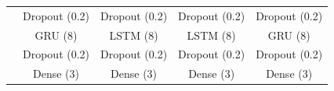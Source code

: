 \begin{table}[htbp]
\begin{tabular}{r|cccccccc}
          & \multicolumn{2}{c}{Dropout (0.2)} & \multicolumn{2}{c}{Dropout (0.2)} & \multicolumn{2}{c}{Dropout (0.2)} & \multicolumn{2}{c}{Dropout (0.2)} \\
          & \multicolumn{2}{c}{GRU (8)} & \multicolumn{2}{c}{LSTM (8)} & \multicolumn{2}{c}{LSTM (8)} & \multicolumn{2}{c}{GRU (8)} \\
          & \multicolumn{2}{c}{Dropout (0.2)} & \multicolumn{2}{c}{Dropout (0.2)} & \multicolumn{2}{c}{Dropout (0.2)} & \multicolumn{2}{c}{Dropout (0.2)} \\
          & \multicolumn{2}{c}{Dense (3)} & \multicolumn{2}{c}{Dense (3)} & \multicolumn{2}{c}{Dense (3)} & \multicolumn{2}{c}{Dense (3)} \\
    \end{tabular}%
  \label{tab:addlabel}%
\end{table}%









